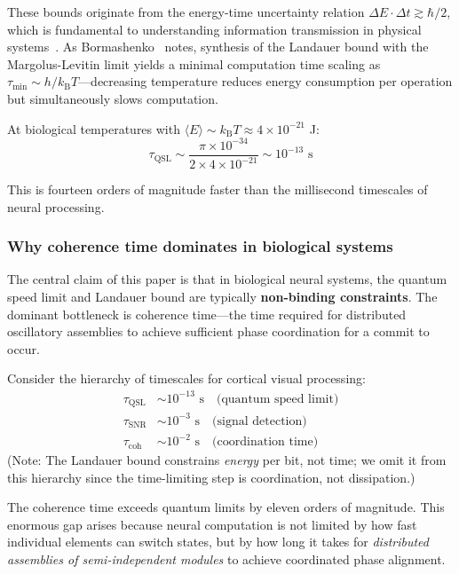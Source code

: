 \documentclass[12pt]{article}
\newcommand{\kB}{k_{\mathrm{B}}}
\begin{document}
These bounds originate from the energy-time uncertainty relation $\Delta E \cdot \Delta t \gtrsim \hbar/2$, which is fundamental to understanding information transmission in physical systems~\cite{khrennikov2021,igamberdiev2025constraints,igamberdiev2026autopoietic}. As Bormashenko~\cite{bormashenko2024} notes, synthesis of the Landauer bound with the Margolus-Levitin limit yields a minimal computation time scaling as $\tau_{\min} \sim h/\kB T$---decreasing temperature reduces energy consumption per operation but simultaneously slows computation.

At biological temperatures with $\langle E \rangle \sim \kB T \approx 4 \times 10^{-21}$ J:
\[
\tau_{\mathrm{QSL}} \sim \frac{\pi \times 10^{-34}}{2 \times 4 \times 10^{-21}} \sim 10^{-13} \text{ s}
\]

This is fourteen orders of magnitude faster than the millisecond timescales of neural processing.

\subsubsection{Why coherence time dominates in biological systems}

The central claim of this paper is that in biological neural systems, the quantum speed limit and Landauer bound are typically \textbf{non-binding constraints}. The dominant bottleneck is coherence time---the time required for distributed oscillatory assemblies to achieve sufficient phase coordination for a commit to occur.

Consider the hierarchy of timescales for cortical visual processing:
\begin{align}
\tau_{\mathrm{QSL}} &\sim 10^{-13} \text{ s} \quad \text{(quantum speed limit)} \\
\tau_{\mathrm{SNR}} &\sim 10^{-3} \text{ s} \quad \text{(signal detection)} \\
\tau_{\mathrm{coh}} &\sim 10^{-2} \text{ s} \quad \text{(coordination time)}
\end{align}
(Note: The Landauer bound constrains \emph{energy} per bit, not time; we omit it from this hierarchy since the time-limiting step is coordination, not dissipation.)

The coherence time exceeds quantum limits by eleven orders of magnitude. This enormous gap arises because neural computation is not limited by how fast individual elements can switch states, but by how long it takes for \emph{distributed assemblies of semi-independent modules} to achieve coordinated phase alignment.
\end{document}
